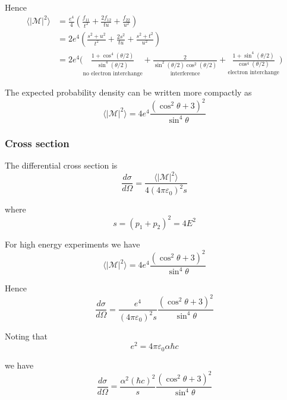 Hence
\begin{align*}
\langle|\mathcal{M}|^2\rangle
&=\frac{e^4}{4}
\left(
\frac{f_{11}}{t^2}+\frac{2f_{12}}{tu}+\frac{f_{22}}{u^2}
\right)
\\
&=2e^4
\left(
\frac{s^2+u^2}{t^2}+\frac{2s^2}{tu}+\frac{s^2+t^2}{u^2}
\right)
\\
&=2e^4\biggl(
\underset{\text{no electron interchange}}
{\frac{1+\cos^4(\theta/2)}{\sin^4(\theta/2)}}
+
\underset{\text{interference}}
{\frac{2}{\sin^2(\theta/2)\cos^2(\theta/2)}}
+
\underset{\text{electron interchange}}
{\frac{1+\sin^4(\theta/2)}{\cos^4(\theta/2)}}
\biggr)
\end{align*}

The expected probability density can be written more compactly as
\begin{equation*}
\langle|\mathcal{M}|^2\rangle=4e^4\frac{(\cos^2\theta+3)^2}{\sin^4\theta}
\end{equation*}

\subsubsection*{Cross section}

The differential cross section is
\begin{equation*}
\frac{d\sigma}{d\Omega}=\frac{\langle|\mathcal{M}|^2\rangle}{4(4\pi\varepsilon_0)^2s}
\end{equation*}

where
\begin{equation*}
s=(p_1+p_2)^2=4E^2
\end{equation*}

For high energy experiments we have
\begin{equation*}
\langle|\mathcal{M}|^2\rangle=4e^4\frac{(\cos^2\theta+3)^2}{\sin^4\theta}
\end{equation*}

Hence
\begin{equation*}
\frac{d\sigma}{d\Omega}=\frac{e^4}{(4\pi\varepsilon_0)^2s}\frac{(\cos^2\theta+3)^2}{\sin^4\theta}
\end{equation*}

Noting that
\begin{equation*}
e^2=4\pi\varepsilon_0\alpha\hbar c
\end{equation*}

we have
\begin{equation*}
\frac{d\sigma}{d\Omega}=\frac{\alpha^2(\hbar c)^2}{s}
\frac{(\cos^2\theta+3)^2}{\sin^4\theta}
\end{equation*}

